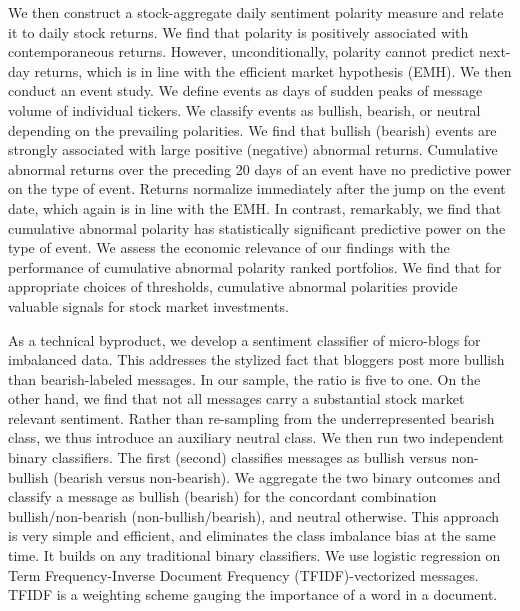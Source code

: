 We then construct a stock-aggregate daily sentiment polarity measure and relate it to daily stock returns. We find that polarity is positively associated with contemporaneous returns. However, unconditionally, polarity cannot predict next-day returns, which is in line with the efficient market hypothesis (EMH). We then conduct an event study. We define events as days of sudden peaks of message volume of individual tickers. We classify events as bullish, bearish, or neutral depending on the prevailing polarities. We find that bullish (bearish) events are strongly associated with large positive (negative) abnormal returns. Cumulative abnormal returns over the preceding 20 days of an event have no predictive power on the type of event. Returns normalize immediately after the jump on the event date, which again is in line with the EMH. In contrast, remarkably, we find that cumulative abnormal polarity has statistically significant predictive power on the type of event. We assess the economic relevance of our findings with the performance of cumulative abnormal polarity ranked portfolios. We find that for appropriate choices of thresholds, cumulative abnormal polarities provide valuable signals for stock market investments.

As a technical byproduct, we develop a sentiment classifier of micro-blogs for imbalanced data. This addresses the stylized fact that bloggers post more bullish than bearish-labeled messages. In our sample, the ratio is five to one. On the other hand, we find that not all messages carry a substantial stock market relevant sentiment. Rather than re-sampling from the underrepresented bearish class, we thus introduce an auxiliary neutral class. We then run two independent binary classifiers. The first (second) classifies messages as bullish versus non-bullish (bearish versus non-bearish). We aggregate the two binary outcomes and classify a message as bullish (bearish) for the concordant combination bullish/non-bearish (non-bullish/bearish), and neutral otherwise. This approach is very simple and efficient, and eliminates the class imbalance bias at the same time. It builds on any traditional binary classifiers. We use logistic regression on Term Frequency-Inverse Document Frequency (TFIDF)-vectorized messages. TFIDF is a weighting scheme gauging the importance of a word in a document.

